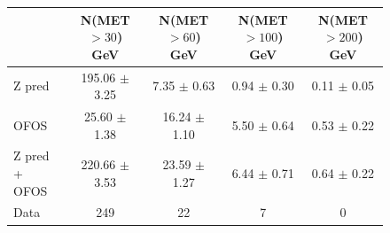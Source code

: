 \begin{figure}[hbtp]
  \begin{center}

	\medskip 

    \begin{tabular}{lcccc}
\hline

                        &   N(MET $>30$)  GeV    &   N(MET $>60$)  GeV    &   N(MET $>100$) GeV    &   N(MET $>200$) GeV \\
\hline
        Z pred  &  195.06  $\pm$  3.25  &    7.35  $\pm$  0.63  &    0.94  $\pm$  0.30  &    0.11  $\pm$  0.05 \\
          OFOS  &   25.60  $\pm$  1.38  &   16.24  $\pm$  1.10  &    5.50  $\pm$  0.64  &    0.53  $\pm$  0.22 \\
\hline
 Z pred + OFOS  &  220.66  $\pm$  3.53  &   23.59  $\pm$  1.27  &    6.44  $\pm$  0.71  &    0.64  $\pm$  0.22 \\
\hline
          Data  &                  249  &                   22  &                    7  &                    0 \\


\hline
    \end{tabular}

    \caption{  }
    \label{fig:pfmet_ee}
  \end{center}
\end{figure}

